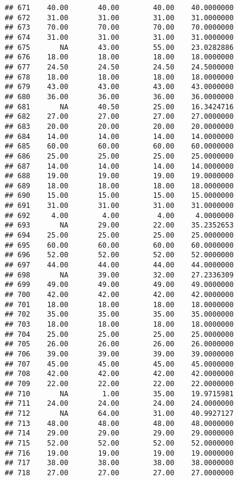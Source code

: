 \documentclass[
]{article}
\begin{document}
\begin{verbatim}
## 671    40.00       40.00        40.00    40.0000000
## 672    31.00       31.00        31.00    31.0000000
## 673    70.00       70.00        70.00    70.0000000
## 674    31.00       31.00        31.00    31.0000000
## 675       NA       43.00        55.00    23.0282886
## 676    18.00       18.00        18.00    18.0000000
## 677    24.50       24.50        24.50    24.5000000
## 678    18.00       18.00        18.00    18.0000000
## 679    43.00       43.00        43.00    43.0000000
## 680    36.00       36.00        36.00    36.0000000
## 681       NA       40.50        25.00    16.3424716
## 682    27.00       27.00        27.00    27.0000000
## 683    20.00       20.00        20.00    20.0000000
## 684    14.00       14.00        14.00    14.0000000
## 685    60.00       60.00        60.00    60.0000000
## 686    25.00       25.00        25.00    25.0000000
## 687    14.00       14.00        14.00    14.0000000
## 688    19.00       19.00        19.00    19.0000000
## 689    18.00       18.00        18.00    18.0000000
## 690    15.00       15.00        15.00    15.0000000
## 691    31.00       31.00        31.00    31.0000000
## 692     4.00        4.00         4.00     4.0000000
## 693       NA       29.00        22.00    35.2352653
## 694    25.00       25.00        25.00    25.0000000
## 695    60.00       60.00        60.00    60.0000000
## 696    52.00       52.00        52.00    52.0000000
## 697    44.00       44.00        44.00    44.0000000
## 698       NA       39.00        32.00    27.2336309
## 699    49.00       49.00        49.00    49.0000000
## 700    42.00       42.00        42.00    42.0000000
## 701    18.00       18.00        18.00    18.0000000
## 702    35.00       35.00        35.00    35.0000000
## 703    18.00       18.00        18.00    18.0000000
## 704    25.00       25.00        25.00    25.0000000
## 705    26.00       26.00        26.00    26.0000000
## 706    39.00       39.00        39.00    39.0000000
## 707    45.00       45.00        45.00    45.0000000
## 708    42.00       42.00        42.00    42.0000000
## 709    22.00       22.00        22.00    22.0000000
## 710       NA        1.00        35.00    19.9715981
## 711    24.00       24.00        24.00    24.0000000
## 712       NA       64.00        31.00    40.9927127
## 713    48.00       48.00        48.00    48.0000000
## 714    29.00       29.00        29.00    29.0000000
## 715    52.00       52.00        52.00    52.0000000
## 716    19.00       19.00        19.00    19.0000000
## 717    38.00       38.00        38.00    38.0000000
## 718    27.00       27.00        27.00    27.0000000

\end{verbatim}
\end{document}
